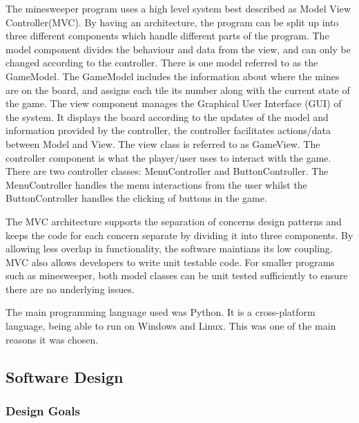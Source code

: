 \documentclass[12pt, a4]{report}
\begin{document}
	\par The minesweeper program uses a high level system best described as Model View Controller(MVC). By having an architecture, the program can be split up into three different components which handle different parts of the program. The model component divides the behaviour and data from the view, and can only be changed according to the controller. There is one model referred to as the GameModel. The GameModel includes the information about where the mines are on the board, and assigns each tile its number along with the current state of the game. The view component manages the Graphical User Interface (GUI) of the system. It displays the board according to the updates of the model and information provided by the controller, the controller facilitates actions/data between Model and View. The view class is referred to as GameView. The controller component is what the player/user uses to interact with the game. There are two controller classes: MenuController and ButtonController. The MenuController handles the menu interactions from the user whilst the ButtonController handles the clicking of buttons in the game.
	\newline
	\par The MVC architecture supports the separation of concerns design patterns and keeps the code for each concern separate by dividing it into three components. By allowing less overlap in functionality, the software maintians its low coupling. MVC also allows developers to write unit testable code. For smaller programs such as minesweeper, both model classes can be unit tested sufficiently to ensure there are no underlying issues. 
	
	\par The main programming language used was Python. It is a cross-platform language, being able to run on Windows and Linux. This was one of the main reasons it was chosen. 

	\pagebreak
	
	\subsection{Software Design}
	\subsubsection{Design Goals}
	
	
	\pagebreak
	
	
\end{document}
